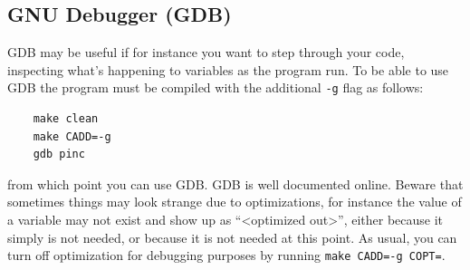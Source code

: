 \documentclass[10pt,a4paper]{article}
\begin{document}
\subsection{GNU Debugger (GDB)}
GDB may be useful if for instance you want to step through your code, inspecting what's happening to variables as the program run. To be able to use GDB the program must be compiled with the additional \verb$-g$ flag as follows:

\begin{verbatim}
	make clean
	make CADD=-g
	gdb pinc
\end{verbatim}
from which point you can use GDB. GDB is well documented online. Beware that sometimes things may look strange due to optimizations, for instance the value of a variable may not exist and show up as ``<optimized out>'', either because it simply is not needed, or because it is not needed at this point. As usual, you can turn off optimization for debugging purposes by running \verb$make CADD=-g COPT=$.
\end{document}
